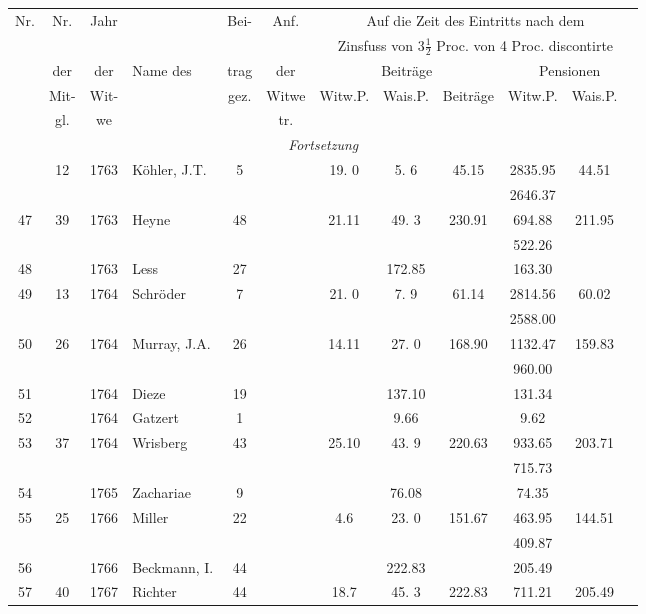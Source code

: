\documentclass[12pt,a4paper]{article}
\begin{document}
\begin{center}
\small
\begin{longtable}{|c|c|c|l|c|c|c|c|c|c|c|c|}
\hline
Nr. & Nr. & Jahr & & Bei- & Anf. & \multicolumn{6}{c|}{Auf die Zeit des Eintritts nach dem} \\
 & & & & & & \multicolumn{6}{c|}{Zinsfuss von $3\frac{1}{2}$ Proc. \quad von 4 Proc. discontirte} \\
 & der & der & Name des & trag & der & \multicolumn{3}{c|}{Beiträge} & \multicolumn{3}{c|}{Pensionen} \\
 & Mit- & Wit- & & gez. & Witwe & Witw.P. & Wais.P. & Beiträge & Witw.P. & Wais.P. \\
 & gl. & we & & & tr. & & & & & \\
\hline
\endfirsthead
\hline
\multicolumn{12}{|c|}{\textit{Fortsetzung}} \\
\hline
\endhead
\hline
\endfoot
46 & 12 & 1763 & Köhler, J.T. & 5 & & 19. 0 & 5. 6 & 45.15 & 2835.95 & 44.51 \\
 & & & & & & & & & 2646.37 & \\
47 & 39 & 1763 & Heyne & 48 & & 21.11 & 49. 3 & 230.91 & 694.88 & 211.95 \\
 & & & & & & & & & 522.26 & \\
48 & & 1763 & Less & 27 & & & 172.85 & & 163.30 & \\
49 & 13 & 1764 & Schröder & 7 & & 21. 0 & 7. 9 & 61.14 & 2814.56 & 60.02 \\
 & & & & & & & & & 2588.00 & \\
50 & 26 & 1764 & Murray, J.A. & 26 & & 14.11 & 27. 0 & 168.90 & 1132.47 & 159.83 \\
 & & & & & & & & & 960.00 & \\
51 & & 1764 & Dieze & 19 & & & 137.10 & & 131.34 & \\
52 & & 1764 & Gatzert & 1 & & & 9.66 & & 9.62 & \\
53 & 37 & 1764 & Wrisberg & 43 & & 25.10 & 43. 9 & 220.63 & 933.65 & 203.71 \\
 & & & & & & & & & 715.73 & \\
54 & & 1765 & Zachariae & 9 & & & 76.08 & & 74.35 & \\
55 & 25 & 1766 & Miller & 22 & & 4.6 & 23. 0 & 151.67 & 463.95 & 144.51 \\
 & & & & & & & & & 409.87 & \\
56 & & 1766 & Beckmann, I. & 44 & & & 222.83 & & 205.49 & \\
57 & 40 & 1767 & Richter & 44 & & 18.7 & 45. 3 & 222.83 & 711.21 & 205.49 \\

\end{longtable}
\end{center}
\end{document}
